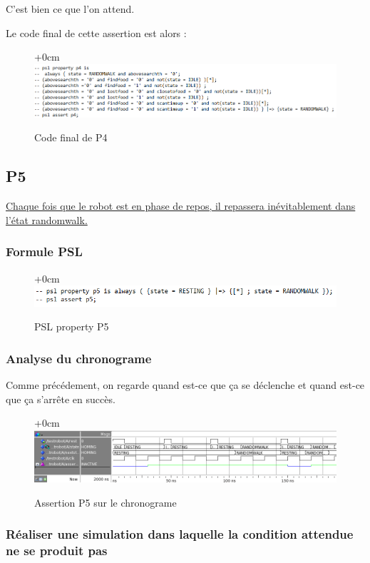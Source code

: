 \documentclass{article}
\newcommand{\sautligne}{
\textbf{\vspace{5mm}}
}
\begin{document}
C'est bien ce que l'on attend.
\sautligne

Le code final de cette assertion est alors : 

 \begin{figure}[!h]
\advance\leftskip+0cm
\includegraphics[scale=0.6]{PSL/P4-5.PNG}
\caption{Code final de P4 }
\end{figure}



\subsection{P5}
\uline{Chaque fois que le robot est en phase de repos, il repassera inévitablement dans l'état
randomwalk.}
\subsubsection{Formule PSL }
\begin{figure}[!h]
\advance\leftskip+0cm
\includegraphics[scale=0.7]{PSL/P5.PNG}
\caption{PSL property P5}
\end{figure}

\newpage
\subsubsection{Analyse du chronograme}

Comme précédement, on regarde quand est-ce que ça se déclenche et quand est-ce que ça s'arrête en succès.

\begin{figure}[!h]
\advance\leftskip+0cm
\includegraphics[scale=0.6]{PSL/P5-1.PNG}
\caption{Assertion P5 sur le chronograme }
\end{figure}

\subsubsection{ Réaliser une simulation
dans laquelle la condition attendue ne se produit pas}
\end{document}
